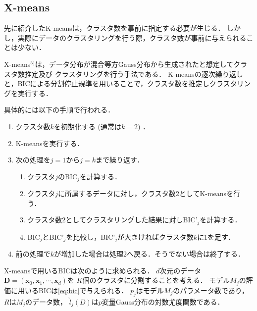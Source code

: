 \subsection{X-means}
先に紹介したK-meansは，クラスタ数を事前に指定する必要が生じる．
しかし，実際にデータのクラスタリングを行う際，クラスタ数が事前に与えられることは少ない．

X-means$^{5)}$は，データ分布が混合等方Gauss分布から生成されたと想定してクラスタ数推定及び
クラスタリングを行う手法である．
K-meansの逐次繰り返しと，BICによる分割停止規準を用いることで，クラスタ数を推定しクラスタリングを実行する．

具体的には以下の手順で行われる．
\begin{enumerate}
    \item クラスタ数$k$を初期化する (通常は$k=2$) ．
    \item K-meansを実行する．
    \item 次の処理を$j=1$から$j=k$まで繰り返す．
    \begin{enumerate}
        \item クラスタ$j$のBIC$_j$を計算する．
        \item クラスタ$j$に所属するデータに対し，クラスタ数2としてK-meansを行う．
        \item クラスタ数2としてクラスタリングした結果に対しBIC'$_j$を計算する．
        \item BIC$_j$とBIC'$_j$を比較し，BIC'$_j$が大きければクラスタ数$k$に1を足す．
    \end{enumerate}
    \item 前の処理で$k$が増加した場合は処理2へ戻る．そうでない場合は終了する．
\end{enumerate}

X-meansで用いるBICは次のように求められる．
$d$次元のデータ${\bm D}=({\bm x_0}, {\bm x_1}, \cdots, {\bm x_d})$を
$K$個のクラスタに分割することを考える．
モデル$M_j$の評価に用いるBICは\eqref{eq:bic}で与えられる．
$p_j$はモデル$M_j$のパラメータ数であり，$R$は$M_j$のデータ数，
$\hat{l}_j(D)$は$p$変量Gauss分布の対数尤度関数である．

